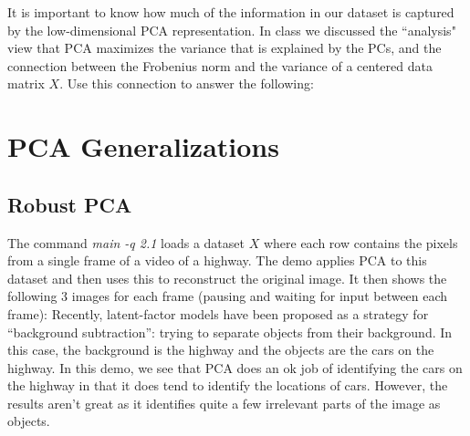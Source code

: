 \documentclass{article}
\begin{document}
It is important to know how much of the information in our dataset is captured by the low-dimensional PCA representation.
In class we discussed the ``analysis" view that PCA maximizes the variance that is explained by the PCs, and the connection between the Frobenius norm and the variance of a centered data matrix $X$. Use this connection to answer the following:

\section{PCA Generalizations}


\subsection{Robust PCA}

The command \emph{main -q 2.1} loads a dataset $X$ where each row contains the pixels from a single frame of a video of a highway. The demo applies PCA to this dataset and then uses this to reconstruct the original image. 
It then shows the following 3 images for each frame (pausing and waiting for input between each frame):
Recently, latent-factor models have been proposed as a strategy for ``background subtraction'': trying to separate objects from their background. In this case, the background is the highway and the objects are the cars on the highway. In this demo, we see that PCA does an ok job of identifying the cars on the highway in that it does tend to identify the locations of cars. However, the results aren't great as it identifies quite a few irrelevant parts of the image as objects.
\end{document}
